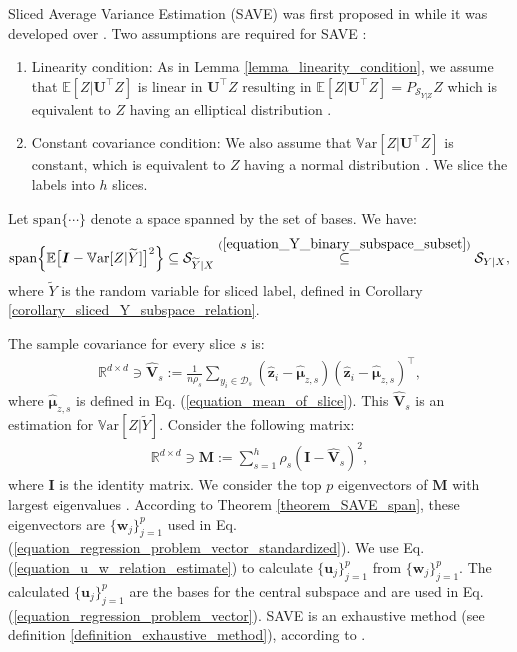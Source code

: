\documentclass[lang=cn,10pt]{gorgeousnbook}
\numberwithin{equation}{section}%
\numberwithin{figure}{section}%
\begin{document}
Sliced Average Variance Estimation (SAVE) was first proposed in \cite{cook2000save} while it was developed over \cite{cook1991sliced,cook1999dimension}.
Two assumptions are required for SAVE \cite{cook2000save}:
\begin{enumerate}
\item Linearity condition: As in Lemma \ref{lemma_linearity_condition}, we assume that $\mathbb{E}[Z | \boldsymbol{U}^\top Z]$ is linear in $\boldsymbol{U}^\top Z$ resulting in $\mathbb{E}[Z | \boldsymbol{U}^\top Z] = P_{\mathcal{S}_{Y|Z}} Z$ which is equivalent to $Z$ having an elliptical distribution \cite{eaton1986characterization}. 
\item Constant covariance condition: We also assume that $\mathbb{V}\text{ar}[Z | \boldsymbol{U}^\top Z]$ is constant, which is equivalent to $Z$ having a normal distribution \cite{cook2000save}. 
We slice the labels into $h$ slices.
\end{enumerate}

\begin{theorem}[]\label{theorem_SAVE_span}
Let $\text{span}\{\cdots\}$ denote a space spanned by the set of bases. We have:
\begin{align*}
\text{span}\Big\{\mathbb{E}\big[\boldsymbol{I} - \mathbb{V}\text{ar}[Z | \widetilde{Y}]\big]^2\Big\} \subseteq \mathcal{S}_{\widetilde{Y}|X} \overset{(\ref{equation_Y_binary_subspace_subset})}{\subseteq} \mathcal{S}_{Y|X},
\end{align*}
where $\widetilde{Y}$ is the random variable for sliced label, defined in Corollary \ref{corollary_sliced_Y_subspace_relation}.
\end{theorem}

The sample covariance for every slice $s$ is:
\begin{align*}
\mathbb{R}^{d \times d} \ni \widehat{\boldsymbol{V}}_s := \frac{1}{n \rho_s} \sum_{y_i \in \mathcal{D}_s} (\widehat{\boldsymbol{z}}_i - \widehat{\boldsymbol{\mu}}_{z,s}) (\widehat{\boldsymbol{z}}_i - \widehat{\boldsymbol{\mu}}_{z,s})^\top,
\end{align*}
where $\widehat{\boldsymbol{\mu}}_{z,s}$ is defined in Eq. (\ref{equation_mean_of_slice}). This $\widehat{\boldsymbol{V}}_s$ is an estimation for $\mathbb{V}\text{ar}[Z | \widetilde{Y}]$.
Consider the following matrix:
\begin{align*}
\mathbb{R}^{d \times d} \ni \boldsymbol{M} := \sum_{s=1}^h \rho_s (\boldsymbol{I} - \widehat{\boldsymbol{V}}_s)^2,
\end{align*}
where $\boldsymbol{I}$ is the identity matrix. 
We consider the top $p$ eigenvectors of $\boldsymbol{M}$ with largest eigenvalues \cite{ghojogh2019eigenvalue}.
According to Theorem \ref{theorem_SAVE_span}, these eigenvectors are $\{\boldsymbol{w}_j\}_{j=1}^p$ used in Eq. (\ref{equation_regression_problem_vector_standardized}). 
We use Eq. (\ref{equation_u_w_relation_estimate}) to calculate $\{\boldsymbol{u}_j\}_{j=1}^p$ from $\{\boldsymbol{w}_j\}_{j=1}^p$. The calculated $\{\boldsymbol{u}_j\}_{j=1}^p$ are the bases for the central subspace and are used in Eq. (\ref{equation_regression_problem_vector}).
SAVE is an exhaustive method (see definition \ref{definition_exhaustive_method}), according to \cite{li2007directional}.
\end{document}
